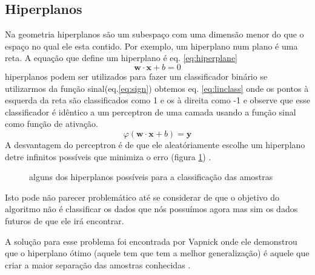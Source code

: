 \subsection{Hiperplanos}
Na geometria hiperplanos s\~ao um subespa\c{c}o com uma dimens\~ao menor do que o espa\c{c}o no qual ele esta contido. Por exemplo, um hiperplano num plano \'e uma reta. A equa\c{c}\~ao que define um hiperplano \'e eq. \ref{eq:hiperplane}
\begin{equation}\label{eq:hiperplane}
\textbf{w} \cdot \textbf{x} + b = 0
\end{equation}
hiperplanos podem ser utilizados para fazer um classificador bin\'ario se utilizarmos da fun\c{c}\~ao sinal(eq.\ref{eq:sign}) obtemos eq. \ref{eq:linclass} onde os pontos \`a esquerda da reta s\~ao classificados como 1 e os \`a direita como -1 e observe que esse classificador \'e id\^entico a um perceptron de uma camada usando a fun\c{c}\~ao sinal como fun\c{c}\~ao de ativa\c{c}\~ao.
\begin{equation}\label{eq:linclass}
\varphi \left( \textbf{w} \cdot \textbf{x} + b \right) = \textbf{y}
\end{equation}
A desvantagem do perceptron \'e de que ele aleat\'oriamente escolhe um hiperplano detre infinitos poss\'iveis que minimiza o erro (figura \ref{fig:hiperplanos}) \cite{SVM2017}.
\begin{figure}[!htp]
	\begin{center}
		\caption{alguns dos hiperplanos poss\'iveis para a classifica\c{c}\~ao das amostras}
		
		\label{fig:hiperplanos}
	\end{center}	
\end{figure}
Isto pode n\~ao parecer problem\'atico at\'e se considerar de que o objetivo do algoritmo n\~ao \'e classificar os dados que n\'os possu\'imos agora mas sim os dados futuros de que ele ir\'a encontrar.
\par
A solu\c{c}\~ao para esse problema foi encontrada por Vapnick  onde ele demonstrou que o hiperplano \'otimo (aquele tem que tem a melhor generaliza\c{c}\~ao) \'e  aquele que criar a maior separa\c{c}\~ao das amostras conhecidas \cite{SVM2017}.
